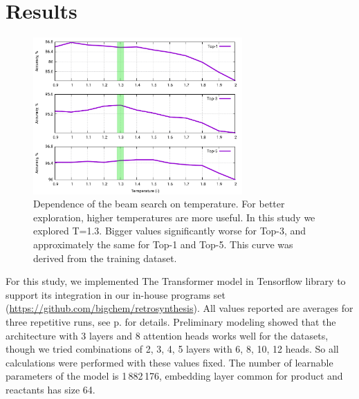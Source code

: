 \documentclass{article}
\begin{document}
\section{Results}
\label{sec:results}

\begin{figure}  
  \vspace{-0.2cm}
  \includegraphics[width = 8cm]{images/tempdep.pdf}
  \caption{Dependence of the beam search on temperature. For better exploration, higher temperatures are more useful. In this study we explored T=1.3. Bigger values significantly worse for Top-3, and approximately the same for Top-1 and Top-5. This curve was derived from the training dataset.}
  \label{fig:tempdep}
  \vspace{-0.5cm}
\end{figure}
For this study, we implemented The Transformer model in Tensorflow \cite{tensorflow} library to support its integration in our in-house programs set (\url{https://github.com/bigchem/retrosynthesis}).  All values reported are averages for three repetitive runs, see p. \pageref{sec:appendix} for details. Preliminary modeling showed that the architecture with 3 layers and 8 attention heads works well for the datasets, though we tried combinations of 2, 3, 4, 5 layers with 6, 8, 10, 12 heads. So all calculations were performed with these values fixed.  The number of learnable parameters of the model is 1\,882\,176, embedding layer common for product and reactants has size 64.
\end{document}
